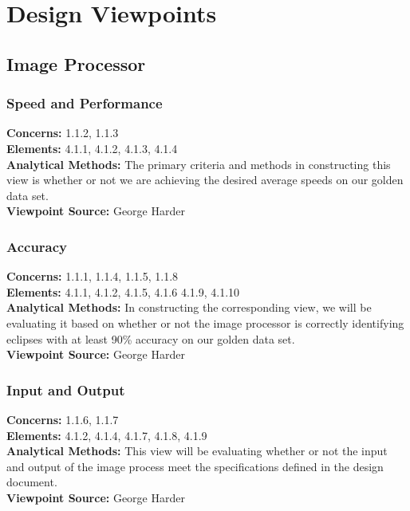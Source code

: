 \documentclass[10pt, onecolumn, draftclsnofoot, letterpaper, compsoc]{IEEEtran}
\begin{document}
\section{Design Viewpoints}

\subsection{Image Processor}

\subsubsection{Speed and Performance}

\textbf{Concerns:} 1.1.2, 1.1.3 \\
\textbf{Elements:} 4.1.1, 4.1.2, 4.1.3, 4.1.4\\
\textbf{Analytical Methods:} The primary criteria and methods in constructing
this view is whether or not we are achieving the desired average speeds on our
golden data set. \\
\textbf{Viewpoint Source:} George Harder \\

\subsubsection{Accuracy}

\textbf{Concerns:} 1.1.1, 1.1.4, 1.1.5, 1.1.8 \\
\textbf{Elements:} 4.1.1, 4.1.2, 4.1.5, 4.1.6 4.1.9, 4.1.10\\
\textbf{Analytical Methods:}  In constructing the corresponding view, we will be
evaluating it based on whether or not the image processor is correctly
identifying eclipses with at least 90\% accuracy on our golden data set.\\
\textbf{Viewpoint Source:} George Harder \\

\subsubsection{Input and Output}

\textbf{Concerns:} 1.1.6, 1.1.7 \\
\textbf{Elements:} 4.1.2, 4.1.4, 4.1.7, 4.1.8, 4.1.9\\
\textbf{Analytical Methods:} This view will be evaluating whether or not the
input and output of the image process meet the specifications defined in the
design document. \\
\textbf{Viewpoint Source:} George Harder\\
\end{document}
